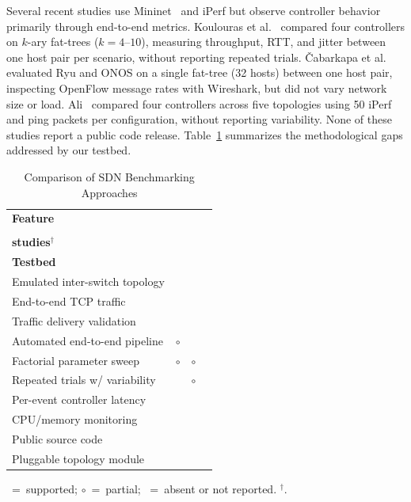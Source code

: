 \documentclass[conference]{IEEEtran}
\newcommand{\cmark}{\ding{51}}
\newcommand{\pmark}{$\circ$}
\newcommand{\xmark}{\ding{55}}
\begin{document}
Several recent studies use Mininet~\cite{Lantz2010Mininet} and
iPerf but observe controller behavior primarily through
end-to-end metrics. Koulouras et al.~\cite{Koulouras2022RealWorld}
compared four controllers on $k$-ary fat-trees ($k{=}4$--$10$),
measuring throughput, RTT, and jitter between one host pair per
scenario, without reporting repeated trials.
\v{C}abarkapa et al.~\cite{Cabarkapa2022TreeTopology} evaluated
Ryu and ONOS on a single fat-tree (32 hosts) between one host
pair, inspecting OpenFlow message rates with Wireshark, but did
not vary network size or load. Ali~\cite{Ali2024Comparison}
compared four controllers across five topologies using 50 iPerf
and ping packets per configuration, without reporting variability.
None of these studies report a public code release.
Table~\ref{tab:comparison} summarizes the methodological gaps
addressed by our testbed.

\begin{table}[t]
\centering
\caption{Comparison of SDN Benchmarking Approaches}
\label{tab:comparison}
\renewcommand{\arraystretch}{1.15}
\begin{tabular}{lccc}
\toprule
\textbf{Feature} &
\makecell{\textbf{CBench}\\\cite{cbench2012}} &
\makecell{\textbf{Mininet}\\\textbf{studies}$^{\dagger}$} &
\makecell{\textbf{Our}\\\textbf{Testbed}} \\
\midrule
Emulated inter-switch topology & \xmark & \cmark & \cmark \\
End-to-end TCP traffic         & \xmark & \cmark & \cmark \\
Traffic delivery validation    & \xmark & \xmark & \cmark \\
Automated end-to-end pipeline  & \pmark & \xmark & \cmark \\
Factorial parameter sweep      & \pmark & \pmark & \cmark \\
Repeated trials w/ variability & \cmark & \pmark & \cmark \\
Per-event controller latency   & \xmark & \xmark & \cmark \\
CPU/memory monitoring          & \xmark & \xmark & \cmark \\
Public source code             & \cmark & \xmark & \cmark \\
Pluggable topology module      & \xmark & \xmark & \cmark \\
\bottomrule
\end{tabular}
\vspace{1pt}
{\footnotesize \cmark~=~supported; \pmark~=~partial;
\xmark~=~absent or not reported.
$^{\dagger}$\cite{Koulouras2022RealWorld,Cabarkapa2022TreeTopology,Ali2024Comparison}.}
\end{table}
\end{document}

